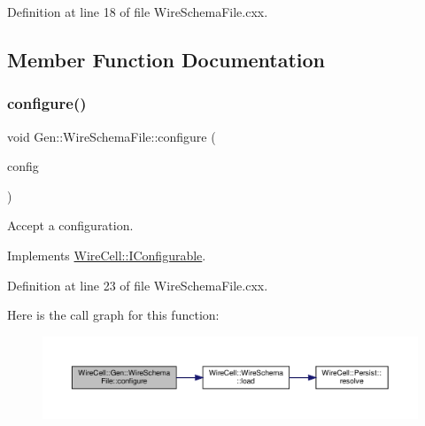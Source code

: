 Definition at line 18 of file Wire\+Schema\+File.\+cxx.



\subsection{Member Function Documentation}
\mbox{\label{class_wire_cell_1_1_gen_1_1_wire_schema_file_a790d78e917e9fb5b2b19406e4b054c03}} 
\subsubsection{\texorpdfstring{configure()}{configure()}}
{\footnotesize\ttfamily void Gen\+::\+Wire\+Schema\+File\+::configure (\begin{DoxyParamCaption}\item[{const \hyperlink{namespace_wire_cell_a9f705541fc1d46c608b3d32c182333ee}{Wire\+Cell\+::\+Configuration} \&}]{config }\end{DoxyParamCaption})\hspace{0.3cm}{\ttfamily [virtual]}}



Accept a configuration. 



Implements \hyperlink{class_wire_cell_1_1_i_configurable_a57ff687923a724093df3de59c6ff237d}{Wire\+Cell\+::\+I\+Configurable}.



Definition at line 23 of file Wire\+Schema\+File.\+cxx.

Here is the call graph for this function\+:
\nopagebreak
\begin{figure}[H]
\begin{center}
\leavevmode
\includegraphics[width=350pt]{class_wire_cell_1_1_gen_1_1_wire_schema_file_a790d78e917e9fb5b2b19406e4b054c03_cgraph}
\end{center}
\end{figure}
\mbox{\label{class_wire_cell_1_1_gen_1_1_wire_schema_file_a5ab602615a1b5ff472535c65f1f0fb9a}} 
